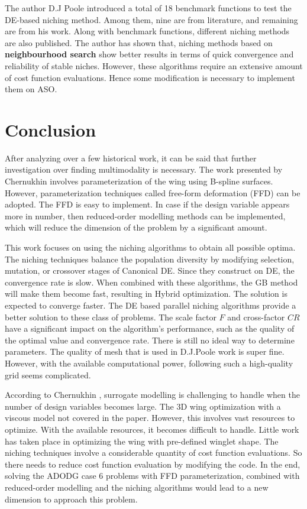 The author D.J Poole \cite{Poole3} introduced a total of 18 benchmark functions to test the DE-based niching method. Among them, nine are from literature, and remaining are from his work. Along with benchmark functions, different niching methods are also published. The author has shown that, niching methods based on \textbf{neighbourhood search} show better results in terms of quick convergence and reliability of stable niches. However, these algorithms require an extensive amount of cost function evaluations. Hence some modification is necessary to implement them on ASO.

\section{Conclusion}
After analyzing over a few historical work, it can be said that further investigation over finding multimodality is necessary. The work presented by Chernukhin involves parameterization of the wing using B-spline surfaces. However, parameterization techniques called free-form deformation (FFD) can be adopted. The FFD is easy to implement. In case if the design variable appears more in number, then reduced-order modelling methods can be implemented, which will reduce the dimension of the problem by a significant amount.

This work focuses on using the niching algorithms to obtain all possible optima. The niching techniques balance the population diversity by modifying selection, mutation, or crossover stages of Canonical DE. Since they construct on DE, the convergence rate is slow. When combined with these algorithms, the GB method will make them become fast, resulting in Hybrid optimization. The solution is expected to converge faster. The DE based parallel niching algorithms provide a better solution to these class of problems. The scale factor $F$ and cross-factor $ CR $ have a significant impact on the algorithm's performance, such as the quality of the optimal value and convergence rate. There is still no ideal way to determine parameters\cite{chen}. The quality of mesh that is used in D.J.Poole work is super fine. However, with the available computational power, following such a high-quality grid seems complicated. 

According to Chernukhin \cite{oleg}, surrogate modelling is challenging to handle when the number of design variables becomes large. The 3D wing optimization with a viscous model not covered in the paper. However, this involves vast resources to optimize. With the available resources, it becomes difficult to handle. Little work has taken place in optimizing the wing with pre-defined winglet shape. The niching techniques involve a considerable quantity of cost function evaluations. So there needs to reduce cost function evaluation by modifying the code. In the end, solving the ADODG case 6 problems with FFD parameterization, combined with reduced-order modelling and the niching algorithms would lead to a new dimension to approach this problem.